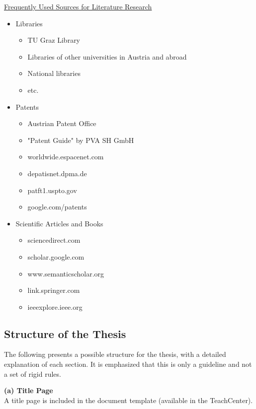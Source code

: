 \documentclass[a4paper, fleqn, headsepline, footsepline, 12pt, parskip=half]{scrartcl}
\begin{document}
\underline{Frequently Used Sources for Literature Research}
\begin{itemize}
    \item Libraries
    \begin{itemize}
        \item TU Graz Library
        \item Libraries of other universities in Austria and abroad
        \item National libraries
        \item etc.
    \end{itemize}
    \item Patents
    \begin{itemize}
        \item Austrian Patent Office
        \item "Patent Guide" by PVA SH GmbH
        \item worldwide.espacenet.com
        \item depatisnet.dpma.de
        \item patft1.uspto.gov
        \item google.com/patents
    \end{itemize}
    \item Scientific Articles and Books
    \begin{itemize}
        \item sciencedirect.com
        \item scholar.google.com
        \item www.semanticscholar.org
        \item link.springer.com
        \item ieeexplore.ieee.org
    \end{itemize}    
\end{itemize}


\subsection{Structure of the Thesis}
\label{sec:structureOfThesis}

The following presents a possible structure for the thesis, with a detailed explanation of each section. It is emphasized that this is only a guideline and not a set of rigid rules.

\textbf{(a) Title Page} \\
A title page is included in the document template (available in the TeachCenter).
\end{document}
